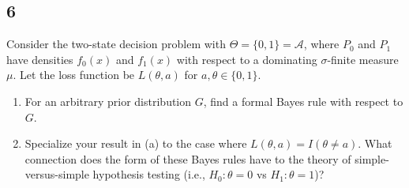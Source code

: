 \documentclass[12pt]{article}
\begin{document}
\subsection*{6}
\begin{tcolorbox}
  Consider the two-state decision problem with $\Theta=\{0,1\}=\mathcal{A}$, where  $P_0$ and $P_1$ have densities $f_0(x)$ and $f_1(x)$
  with respect to a dominating $\sigma$-finite measure $\mu$.  Let the loss function be $L(\theta,a)$ for $a,\theta \in\{0,1\}$.
  \begin{enumerate}
    \item For an arbitrary prior distribution $G$, find a formal Bayes rule with respect to $G$.
    \item Specialize your result in (a) to the case where $L(\theta,a)=I(\theta\neq a)$.  What connection does the form of these Bayes rules have to the theory of simple-versus-simple hypothesis testing (i.e., $H_0:\theta=0$ vs $H_1:\theta=1$)?
  \end{enumerate}
\end{tcolorbox}
\end{document}
